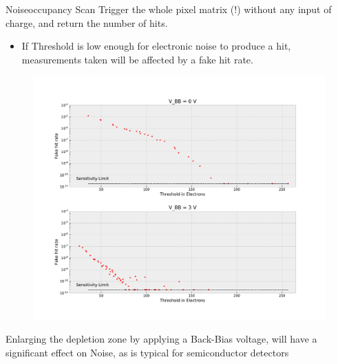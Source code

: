 \documentclass{beamer}
\begin{document}
\begin{frame}{Noiseoccupancy Scan}
    Trigger the whole pixel matrix (!) without any input of charge, and return
    the number of hits.
    \begin{itemize}
	\item If Threshold is low enough for electronic noise to produce a hit,
	    measurements taken will be affected by a fake hit rate.
    \end{itemize}
    \begin{figure}[H]
	\centering
	\includegraphics[trim=0 50 0 382, clip, width=\textwidth]{Fake_Hit_Rate.pdf}
    \end{figure}
    \tiny Enlarging the depletion zone by applying a Back-Bias voltage, will
    have a significant effect on Noise, as is typical for semiconductor
    detectors
\end{frame}

\end{document}
